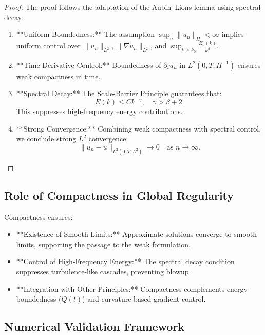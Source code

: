 \begin{proof}
The proof follows the adaptation of the Aubin--Lions lemma using spectral decay:
\begin{enumerate}
    \item **Uniform Boundedness:** The assumption $\sup_n \|u_n\|_H < \infty$ implies uniform control over $\|u_n\|_{L^2}$, $\|\nabla u_n\|_{L^2}$, and $\sup_{k > k_0} \frac{E_n(k)}{k^\beta}$.
    \item **Time Derivative Control:** Boundedness of $\partial_t u_n$ in $L^2(0, T; H^{-1})$ ensures weak compactness in time.
    \item **Spectral Decay:** The Scale-Barrier Principle guarantees that:
    \begin{equation}
    E(k) \leq C k^{-\gamma}, \quad \gamma > \beta + 2.
    \end{equation}
    This suppresses high-frequency energy contributions.
    \item **Strong Convergence:** Combining weak compactness with spectral control, we conclude strong $L^2$ convergence:
    \begin{equation}
    \|u_n - u\|_{L^2(0, T; L^2)} \to 0 \quad \text{as } n \to \infty.
    \end{equation}
\end{enumerate}
\end{proof}

\subsection{Role of Compactness in Global Regularity}
Compactness ensures:
\begin{itemize}
    \item **Existence of Smooth Limits:** Approximate solutions converge to smooth limits, supporting the passage to the weak formulation.
    \item **Control of High-Frequency Energy:** The spectral decay condition suppresses turbulence-like cascades, preventing blowup.
    \item **Integration with Other Principles:** Compactness complements energy boundedness ($Q(t)$) and curvature-based gradient control.
\end{itemize}

\subsection{Numerical Validation Framework}

